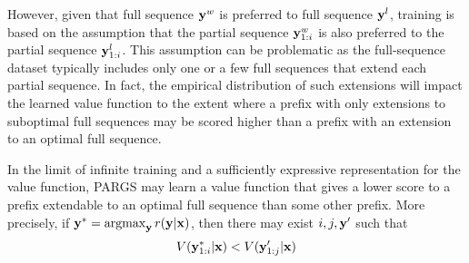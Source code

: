 However, given that full sequence ${\mathbf{y}}^w$ is preferred to full sequence ${\mathbf{y}}^l$, training is based on the assumption that the partial sequence ${\mathbf{y}}^w_{1:i}$ is also preferred to the partial sequence ${\mathbf{y}}^l_{1:i}$. This assumption can be  problematic as the full-sequence dataset typically includes only one or a few full sequences that extend each partial sequence.  In fact, the empirical distribution of such extensions will impact the learned value function to the extent where a prefix with only extensions to suboptimal full sequences may be scored higher than a prefix with an extension to an optimal full sequence. %

\begin{theorem}
\label{thm:pargs}
In the limit of infinite training and a sufficiently expressive representation for the value function, PARGS may learn a value function that gives a lower score to a prefix extendable to an optimal full sequence than some other prefix.  More precisely, if ${\mathbf{y}}^* = \operatorname*{argmax}_{{\mathbf{y}}} r({\mathbf{y}}|{\mathbf{x}})$, then there may exist $i,j,{\mathbf{y}}'$ such that
\begin{equation}
V({\mathbf{y}}^*_{1:i}|{\mathbf{x}}) < V({\mathbf{y}}'_{1:j}|{\mathbf{x}})
\end{equation}
\end{theorem}

